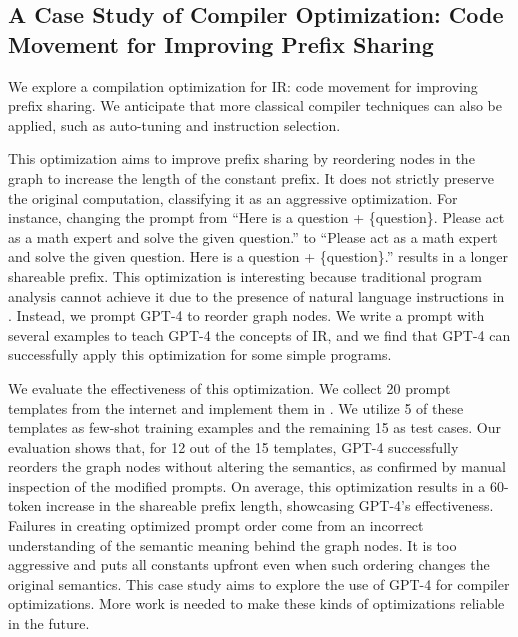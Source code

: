 \subsection{A Case Study of Compiler Optimization: Code Movement for Improving Prefix Sharing}
We explore a compilation optimization for \lang IR: code movement for improving prefix sharing. We anticipate that more classical compiler techniques can also be applied, such as auto-tuning and instruction selection.

This optimization aims to improve prefix sharing by reordering nodes in the graph to increase the length of the constant prefix. It does not strictly preserve the original computation, classifying it as an aggressive optimization. For instance, changing the prompt from ``Here is a question + \{question\}. Please act as a math expert and solve the given question.'' to ``Please act as a math expert and solve the given question. Here is a question + \{question\}.'' results in a longer shareable prefix. This optimization is interesting because traditional program analysis cannot achieve it due to the presence of natural language instructions in \lang. Instead, we prompt GPT-4 to reorder graph nodes. We write a prompt with several examples to teach GPT-4 the concepts of \lang IR, and we find that GPT-4 can successfully apply this optimization for some simple \lang programs.

We evaluate the effectiveness of this optimization. We collect 20 prompt templates from the internet and implement them in \lang. We utilize 5 of these templates as few-shot training examples and the remaining 15 as test cases. Our evaluation shows that, for 12 out of the 15 templates, GPT-4 successfully reorders the graph nodes without altering the semantics, as confirmed by manual inspection of the modified prompts. On average, this optimization results in a 60-token increase in the shareable prefix length, showcasing GPT-4's effectiveness. Failures in creating optimized prompt order come from an incorrect understanding of the semantic meaning behind the graph nodes. It is too aggressive and puts all constants upfront even when such ordering changes the original semantics. This case study aims to explore the use of GPT-4 for compiler optimizations. More work is needed to make these kinds of optimizations reliable in the future.


